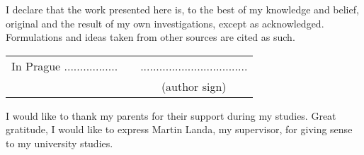 \newcommand{\odsaditodzhora}{\hskip1pt\vfill}

\odsaditodzhora
{}

 \baselineskip

I declare that the work presented here is, to the best of my knowledge and
belief, original and the result of my own investigations, except as acknowledged.
Formulations and ideas taken from other sources are cited as such.

\begin{flushleft}
\begin{tabular}{cp{}c}
In Prague .................
& 
&
..................................
\\
&&
(author sign)
\end{tabular}

\end{flushleft}
\newpage

\odsaditodzhora
{}

 \baselineskip

I would like to thank my parents for their support during my studies.
Great gratitude, I would like to express Martin Landa, my supervisor, for giving sense to my university studies.
\newpage
